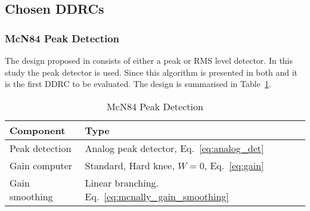\documentclass[../main2.tex]{subfiles}
\begin{document}
\subsection{Chosen DDRCs} \label{method_chosen_DDRC}
\subsubsection{McN84 Peak Detection}
The design proposed in \cite{mcnally1984dynamic} consists of either a peak or RMS level detector. In this study the peak detector is used. Since this algorithm is presented in both \cite{zolzer2008digital} and \cite{dafx11} it is the first DDRC to be evaluated.  The design is summarised in Table~\ref{tab:mcn84}.
\begin{table}[h]
\begin{center}
\caption{McN84 Peak Detection}
\label{tab:mcn84}
\begin{tabular}{| l | l |}
	\hline
	Component & Type \\ \hline
	Peak detection & Analog peak detector, Eq.~\eqref{eq:analog_det} \\
	Gain computer & Standard, Hard knee, $W=0$, Eq.~\eqref{eq:gain} \\
	Gain smoothing & Linear branching. Eq.~\eqref{eq:mcnally_gain_smoothing} \\
	\hline
\end{tabular}
\end{center}
\end{table}
\end{document}
